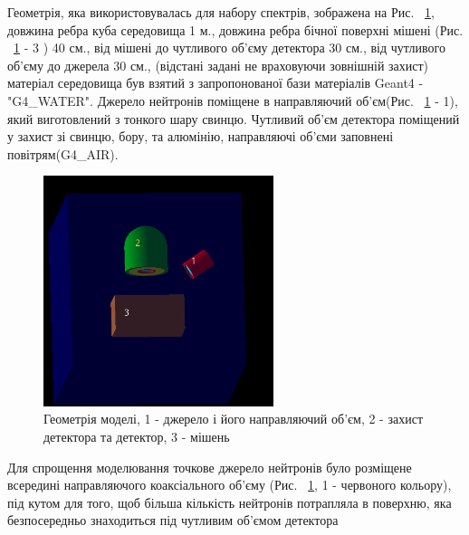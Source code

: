 \documentclass[a4paper, 14pt]{article}
\numberwithin{equation}{section}
\numberwithin{table}{section}
\begin{document}
Геометрія, яка використовувалась для набору спектрів, зображена на Рис. ~\ref{ris:Geometry}, довжина ребра куба середовища 1 м., довжина ребра бічної поверхні мішені (Рис. ~\ref{ris:Geometry} - 3 ) 40 см., від мішені до чутливого об'єму детектора 30 см., від чутливого об'єму до джерела 30 см., (відстані задані не враховуючи зовнішній захист) матеріал середовища був взятий з запропонованої бази матеріалів Geant4 - "G4\_WATER". Джерело нейтронів поміщене в направляючий об'єм(Рис. ~\ref{ris:Geometry} - 1), який виготовлений з тонкого шару свинцю. Чутливий об'єм детектора поміщений у захист зі свинцю, бору, та алюмінію, направляючі об'єми заповнені повітрям(G4\_AIR).
\begin{figure}[!hbt]
	\centering \includegraphics[width=0.6\textwidth]{images/geometryAll.png}
	\caption{Геометрія моделі, 1 - джерело і його направляючий об'єм, 2 - захист детектора та детектор, 3 - мішень} 
	\label{ris:Geometry}	
\end{figure}
Для спрощення моделювання точкове джерело нейтронів було розміщене всередині направляючого коаксіального об'єму (Рис. ~\ref{ris:Geometry}, 1 - червоного кольору), під кутом для того, щоб більша кількість нейтронів потрапляла в поверхню, яка безпосередньо знаходиться під чутливим об'ємом детектора 
\end{document}
